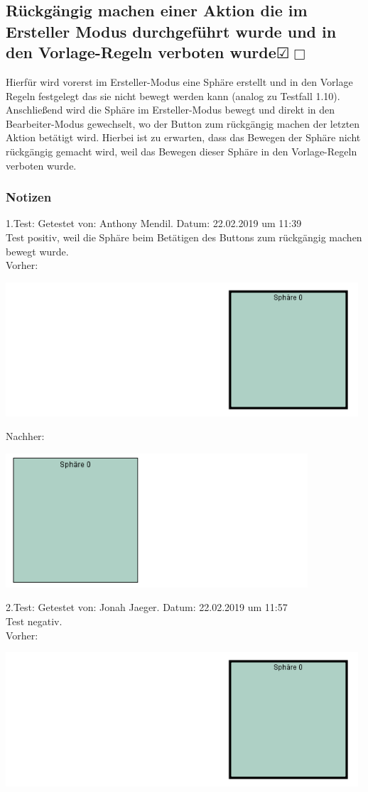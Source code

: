 \documentclass{scrartcl}
\newcommand{\subsectiont}[2]{\subsection[#1]{#1{\normalsize\normalfont #2}}}
\newcommand{\leer}{$\Box$}
\newcommand{\ok}{$\CheckedBox$}
\begin{document}
\subsectiont{Rückgängig machen einer Aktion die im Ersteller Modus durchgeführt wurde und in den Vorlage-Regeln verboten wurde}{\dotfill\XBox\ok\leer}
Hierfür wird vorerst im Ersteller-Modus eine Sphäre erstellt und in den Vorlage Regeln festgelegt das sie nicht bewegt werden kann (analog zu Testfall 1.10). Anschließend wird die Sphäre im Ersteller-Modus bewegt und direkt in den Bearbeiter-Modus gewechselt, wo der Button zum rückgängig machen der letzten Aktion betätigt wird. Hierbei ist zu erwarten, dass das Bewegen der Sphäre nicht rückgängig gemacht wird, weil das Bewegen dieser Sphäre in den Vorlage-Regeln verboten wurde. 
\subsubsection{Notizen}
1.Test: Getestet von: Anthony Mendil. Datum: 22.02.2019 um 11:39 \\
Test positiv, weil die Sphäre beim Betätigen des Buttons zum rückgängig machen bewegt wurde. \\
Vorher: 
\begin{center}
\includegraphics[height=5cm]{2_1vorher.PNG}
\end{center}
Nachher: 
\begin{center}
\includegraphics[height=5cm]{2_1nachher.PNG}
\end{center}
2.Test: Getestet von: Jonah Jaeger. Datum: 22.02.2019 um 11:57 \\
Test negativ. \\
Vorher: 
\begin{center}
\includegraphics[height=5cm]{2_1vorher.PNG}
\end{center}
\end{document}
